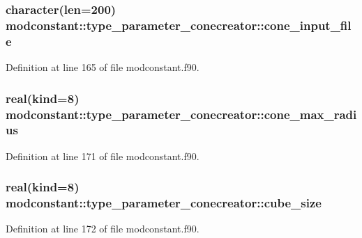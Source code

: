 \subsubsection[{\texorpdfstring{cone\+\_\+input\+\_\+file}{cone_input_file}}]{\setlength{\rightskip}{0pt plus 5cm}character(len=200) modconstant\+::type\+\_\+parameter\+\_\+conecreator\+::cone\+\_\+input\+\_\+file}\hypertarget{structmodconstant_1_1type__parameter__conecreator_a2bdd6648e859eb4c798e2298fe6647b1}{}\label{structmodconstant_1_1type__parameter__conecreator_a2bdd6648e859eb4c798e2298fe6647b1}


Definition at line 165 of file modconstant.\+f90.

\subsubsection[{\texorpdfstring{cone\+\_\+max\+\_\+radius}{cone_max_radius}}]{\setlength{\rightskip}{0pt plus 5cm}real(kind=8) modconstant\+::type\+\_\+parameter\+\_\+conecreator\+::cone\+\_\+max\+\_\+radius}\hypertarget{structmodconstant_1_1type__parameter__conecreator_a86915502305c5da4d6eec7273448f947}{}\label{structmodconstant_1_1type__parameter__conecreator_a86915502305c5da4d6eec7273448f947}


Definition at line 171 of file modconstant.\+f90.

\subsubsection[{\texorpdfstring{cube\+\_\+size}{cube_size}}]{\setlength{\rightskip}{0pt plus 5cm}real(kind=8) modconstant\+::type\+\_\+parameter\+\_\+conecreator\+::cube\+\_\+size}\hypertarget{structmodconstant_1_1type__parameter__conecreator_a5123eeb98fd44cbe5ce7b83c97441108}{}\label{structmodconstant_1_1type__parameter__conecreator_a5123eeb98fd44cbe5ce7b83c97441108}


Definition at line 172 of file modconstant.\+f90.

